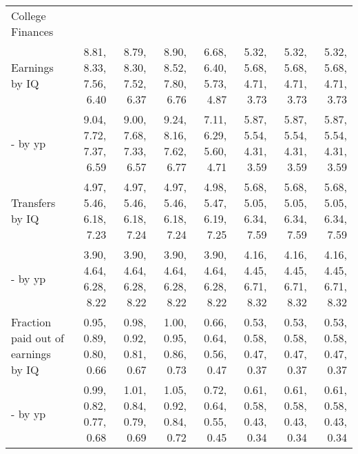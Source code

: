 \begin{tabular}{lrrrrrrr}
\hline
College Finances &   &   &   &   &   &   &   \\ 
Earnings by IQ & 8.81, 8.33, 7.56, 6.40  & 8.79, 8.30, 7.52, 6.37  & 8.90, 8.52, 7.80, 6.76  & 6.68, 6.40, 5.73, 4.87  & 5.32, 5.68, 4.71, 3.73  & 5.32, 5.68, 4.71, 3.73  & 5.32, 5.68, 4.71, 3.73  \\ 
- by yp & 9.04, 7.72, 7.37, 6.59  & 9.00, 7.68, 7.33, 6.57  & 9.24, 8.16, 7.62, 6.77  & 7.11, 6.29, 5.60, 4.71  & 5.87, 5.54, 4.31, 3.59  & 5.87, 5.54, 4.31, 3.59  & 5.87, 5.54, 4.31, 3.59  \\ 
Transfers by IQ & 4.97, 5.46, 6.18, 7.23  & 4.97, 5.46, 6.18, 7.24  & 4.97, 5.46, 6.18, 7.24  & 4.98, 5.47, 6.19, 7.25  & 5.68, 5.05, 6.34, 7.59  & 5.68, 5.05, 6.34, 7.59  & 5.68, 5.05, 6.34, 7.59  \\ 
- by yp & 3.90, 4.64, 6.28, 8.22  & 3.90, 4.64, 6.28, 8.22  & 3.90, 4.64, 6.28, 8.22  & 3.90, 4.64, 6.28, 8.22  & 4.16, 4.45, 6.71, 8.32  & 4.16, 4.45, 6.71, 8.32  & 4.16, 4.45, 6.71, 8.32  \\ 
Fraction paid out of earnings by IQ & 0.95, 0.89, 0.80, 0.66  & 0.98, 0.92, 0.81, 0.67  & 1.00, 0.95, 0.86, 0.73  & 0.66, 0.64, 0.56, 0.47  & 0.53, 0.58, 0.47, 0.37  & 0.53, 0.58, 0.47, 0.37  & 0.53, 0.58, 0.47, 0.37  \\ 
- by yp & 0.99, 0.82, 0.77, 0.68  & 1.01, 0.84, 0.79, 0.69  & 1.05, 0.92, 0.84, 0.72  & 0.72, 0.64, 0.55, 0.45  & 0.61, 0.58, 0.43, 0.34  & 0.61, 0.58, 0.43, 0.34  & 0.61, 0.58, 0.43, 0.34  \\ 
\hline
\end{tabular}%
